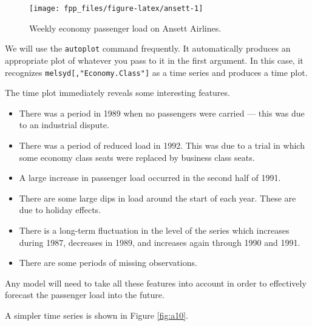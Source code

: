 \documentclass[]{book}
\newenvironment{Shaded}{\begin{snugshade}}{\end{snugshade}}
\newcommand{\KeywordTok}[1]{\textcolor[rgb]{0.13,0.29,0.53}{\textbf{#1}}}
\newcommand{\NormalTok}[1]{#1}
\newcommand{\OperatorTok}[1]{\textcolor[rgb]{0.81,0.36,0.00}{\textbf{#1}}}
\newcommand{\StringTok}[1]{\textcolor[rgb]{0.31,0.60,0.02}{#1}}
\providecommand{\tightlist}{%
  \setlength{\itemsep}{0pt}\setlength{\parskip}{0pt}}
\begin{document}
\begin{figure}

{\centering \texttt{[image: fpp\_files/figure-latex/ansett-1]} 

}

\caption{Weekly economy passenger load on Ansett Airlines.}\label{fig:ansett}
\end{figure}

We will use the \texttt{autoplot} command frequently. It automatically produces an appropriate plot of whatever you pass to it in the first argument. In this case, it recognizes \texttt{melsyd{[},"Economy.Class"{]}} as a time series and produces a time plot.

The time plot immediately reveals some interesting features.

\begin{itemize}
\tightlist
\item
  There was a period in 1989 when no passengers were carried --- this was due to an industrial dispute.
\item
  There was a period of reduced load in 1992. This was due to a trial in which some economy class seats were replaced by business class seats.
\item
  A large increase in passenger load occurred in the second half of 1991.
\item
  There are some large dips in load around the start of each year. These are due to holiday effects.
\item
  There is a long-term fluctuation in the level of the series which increases during 1987, decreases in 1989, and increases again through 1990 and 1991.
\item
  There are some periods of missing observations.
\end{itemize}

Any model will need to take all these features into account in order to effectively forecast the passenger load into the future.

A simpler time series is shown in Figure \ref{fig:a10}.

\begin{Shaded}
\end{Shaded}
\end{document}
